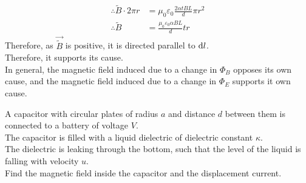 \documentclass[fleqn, a4paper, 12pt, twoside]{article}
\theoremstyle{definition}
\theoremstyle{theorem}
\begin{document}
\begin{solution}
\begin{align*}
		\therefore \tilde{B} \cdot 2 \pi r                     & = \mu_0 \varepsilon_0 \frac{2 \alpha t B L}{d} \pi r^2                                                                                                             \\
		\therefore \tilde{B}                                   & = \frac{\mu_0 \varepsilon_0 \alpha B L}{d} t r
	\end{align*}
	Therefore, as $\overrightarrow{\tilde{B}}$ is positive, it is directed parallel to $\dif l$.\\
	Therefore, it supports its cause.\\
	In general, the magnetic field induced due to a change in $\Phi_B$ opposes its own cause, and the magnetic field induced due to a change in $\Phi_E$ supports it own cause.
\end{solution}

\begin{question}
	A capacitor with circular plates of radius $a$ and distance $d$ between them is connected to a battery of voltage $V$.\\
	The capacitor is filled with a liquid dielectric of dielectric constant $\kappa$.\\
	The dielectric is leaking through the bottom, such that the level of the liquid is falling with velocity $u$.\\
	Find the magnetic field inside the capacitor and the displacement current.
	\begin{figure}[H]
	\end{figure}
\end{question}
\end{document}
